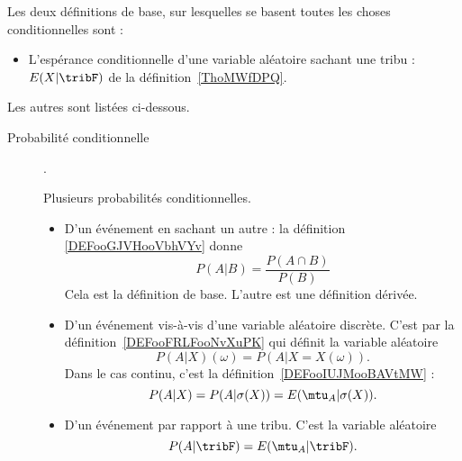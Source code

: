 
	\label{THEMEooProbaConditionnelles}

Les deux définitions de base, sur lesquelles se basent toutes les choses conditionnelles sont :
\begin{itemize}
	\item L'espérance conditionnelle d'une variable aléatoire sachant une tribu : \( E(X|\tribF)\) de la définition~\ref{ThoMWfDPQ}.
\end{itemize}

Les autres sont listées ci-dessous.
\begin{description}

	\item[Probabilité conditionnelle].

	      Plusieurs probabilités conditionnelles.
	      \begin{itemize}
		      \item D'un événement en sachant un autre : la définition \ref{DEFooGJVHooVbhVYv} donne
		            \begin{equation*}
			            P(A|B)=\frac{ P(A\cap B) }{ P(B) }
		            \end{equation*}
		            Cela est la définition de base. L'autre est une définition dérivée.
		      \item D'un événement vis-à-vis d'une variable aléatoire discrète. C'est par la définition~\ref{DEFooFRLFooNvXuPK} qui définit la variable aléatoire
		            \begin{equation*}
			            P(A|X)(\omega)=P(A|X=X(\omega)).
		            \end{equation*}
		            Dans le cas continu, c'est la définition~\ref{DEFooIUJMooBAVtMW} :
		            \begin{equation*}
			            P(A|X)=P(A|\sigma(X))=E(\mtu_A|\sigma(X)).
		            \end{equation*}

		      \item D'un événement par rapport à une tribu. C'est la variable aléatoire
		            \begin{equation*}
			            P(A|\tribF)=E(\mtu_A|\tribF).
		            \end{equation*}


\end{itemize}
\end{description}

